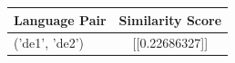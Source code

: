 \begin{tabular}{|l|c|}
\hline
Language Pair & Similarity Score \\
\hline
('de1', 'de2') & [[0.22686327]] \\
\hline
\end{tabular}

